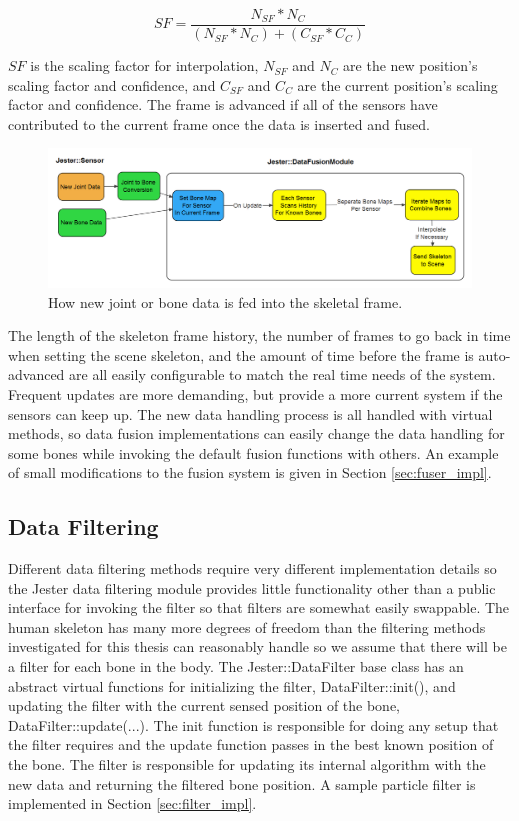 \begin{equation}
SF = \frac{N_{SF} * N_{C}}{(N_{SF} * N_{C}) + (C_{SF} * C_{C})}
\end{equation}

$SF$ is the scaling factor for interpolation, $N_{SF}$ and $N_{C}$ are the new position's scaling factor and confidence, and $C_{SF}$ and $C_{C}$ are the current position's scaling factor and confidence. The frame is advanced if all of the sensors have contributed to the current frame once the data is inserted and fused. 

\begin{figure}[]
\centering
\includegraphics[width=1\textwidth]{figures/insertionDataflow}
\caption{How new joint or bone data is fed into the skeletal frame.}
\label{fig:new_data_flow}
\end{figure}

The length of the skeleton frame history, the number of frames to go back in time when setting the scene skeleton, and the amount of time before the frame is auto-advanced are all easily configurable to match the real time needs of the system. Frequent updates are more demanding, but provide a more current system if the sensors can keep up. The new data handling process is all handled with virtual methods, so data fusion implementations can easily change the data handling for some bones while invoking the default fusion functions with others. An example of small modifications to the fusion system is given in Section \ref{sec:fuser_impl}.
	
\subsection{Data Filtering}

Different data filtering methods require very different implementation details so the Jester data filtering module provides little functionality other than a public interface for invoking the filter so that filters are somewhat easily swappable. The human skeleton has many more degrees of freedom than the filtering methods investigated for this thesis can reasonably handle so we assume that there will be a filter for each bone in the body. The Jester::DataFilter base class has an abstract virtual functions for initializing the filter, DataFilter::init(), and updating the filter with the current sensed position of the bone, \mbox{DataFilter::update(...)}. The init function is responsible for doing any setup that the filter requires and the update function passes in the best known position of the bone. The filter is responsible for updating its internal algorithm with the new data and returning the filtered bone position. A sample particle filter is implemented in Section \ref{sec:filter_impl}.
